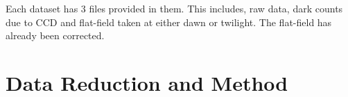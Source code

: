 \documentclass[a4paper,12pt]{article}
\begin{document}
Each dataset has 3 files provided in them. This includes, raw data, dark counts due to CCD and flat-field taken at either dawn or twilight. The flat-field has already been corrected. 
\section{Data Reduction and Method}
\label{sec:reduction}


\end{document}
